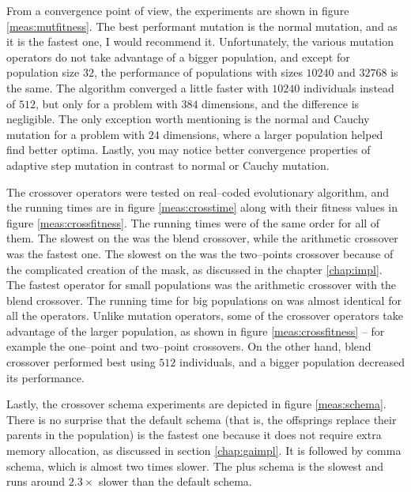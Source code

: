 From a convergence point of view, the experiments are shown in figure \ref{meas:mutfitness}. The best performant mutation is the normal mutation, and as it is the fastest one, I would recommend it. Unfortunately, the various mutation operators do not take advantage of a bigger population, and except for population size $32$, the performance of populations with sizes $10240$ and $32768$ is the same. The algorithm converged a little faster with $10240$ individuals instead of $512$, but only for a problem with $384$ dimensions, and the difference is negligible. The only exception worth mentioning is the normal and Cauchy mutation for a problem with $24$ dimensions, where a larger population helped find better optima. Lastly, you may notice better convergence properties of adaptive step mutation in contrast to normal or Cauchy mutation.

The crossover operators were tested on real--coded evolutionary algorithm, and the running times are in figure \ref{meas:crosstime} along with their fitness values in figure \ref{meas:crossfitness}. The running times were of the same order for all of them. The slowest on the \cpu was the blend crossover, while the arithmetic crossover was the fastest one. The slowest on the \cpu was the two--points crossover because of the complicated creation of the mask, as discussed in the chapter \ref{chap:impl}. The fastest operator for small populations was the arithmetic crossover with the blend crossover. The running time for big populations on \gpu was almost identical for all the operators. Unlike mutation operators, some of the crossover operators take advantage of the larger population, as shown in figure \ref{meas:crossfitness} -- for example the one--point and two--point crossovers. On the other hand, blend crossover performed best using $512$ individuals, and a bigger population decreased its performance.

Lastly, the crossover schema experiments are depicted in figure \ref{meas:schema}. There is no surprise that the default schema (that is, the offsprings replace their parents in the population) is the fastest one because it does not require extra memory allocation, as discussed in section \ref{chap:gaimpl}. It is followed by comma schema, which is almost two times slower. The plus schema is the slowest and runs around $2.3\times$ slower than the default schema.

